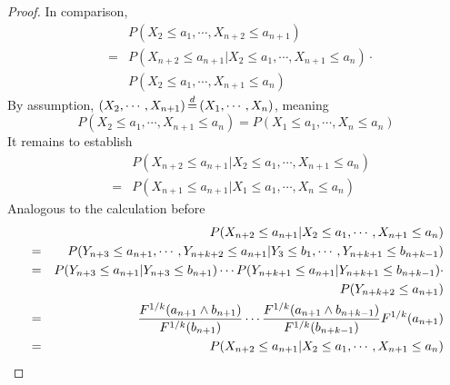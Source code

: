 \documentclass{report}
\begin{document}
\begin{enumerate}[1.]
\begin{enumerate}[(a)]
\begin{proof}
      In comparison,
      \begin{eqnarray*}
        && P(X_2 \le a_1, \cdots, X_{n+2} \le a_{n+1}) \\
        &=& P(X_{n+2} \le a_{n+1} | X_2 \le a_1, \cdots, X_{n+1} \le
        a_{n}) \cdot \\
        && P(X_2 \le a_1, \cdots, X_{n+1} \le a_{n})
      \end{eqnarray*}
      By assumption, $(X_2, \cdots, X_{n+1}) \ed (X_1, \cdots, X_{n})$,
      meaning
      \[
      P(X_2 \le a_1, \cdots, X_{n+1} \le a_{n}) = P(X_1 \le
      a_1, \cdots, X_{n} \le a_{n})
      \]
      It remains to establish
      \begin{eqnarray*}
        && P(X_{n+2} \le a_{n+1} | X_2 \le a_1, \cdots, X_{n+1} \le
        a_{n}) \\
        &=& P(X_{n+1} \le a_{n+1} | X_1 \le a_1, \cdots, X_{n} \le
        a_{n})
      \end{eqnarray*}
      Analogous to the calculation before
      \begin{eqnarray*}
        && P(X_{n+2} \le a_{n+1} | X_2 \le a_1, \cdots, X_{n+1} \le
        a_{n})      \\
        &=& P(Y_{n+3} \le a_{n+1}, \cdots, Y_{n+k+2} \le a_{n+1} | Y_3
        \le b_1, \cdots, Y_{n+k+1} \le b_{n+k-1}) \\
        &=& P(Y_{n+3} \le a_{n+1} | Y_{n+3} \le b_{n+1}) \cdots
        P(Y_{n+k+1} \le a_{n+1} | Y_{n+k+1} \le b_{n+k-1}) \cdot \\
        && P(Y_{n+k+2} \le a_{n+1}) \\
        &=& {F^{1/k}(a_{n+1} \wedge b_{n+1}) \over F^{1/k}(b_{n+1})} \cdots
        {F^{1/k}(a_{n+1} \wedge b_{n+k-1}) \over F^{1/k}(b_{n+k-1})}
        F^{1/k}(a_{n+1}) \\
        &=& P(X_{n+2} \le a_{n+1} | X_2 \le a_1, \cdots, X_{n+1} \le
        a_{n})\\
      \end{eqnarray*}
    \end{proof}


\end{enumerate}
\end{enumerate}
\end{document}
